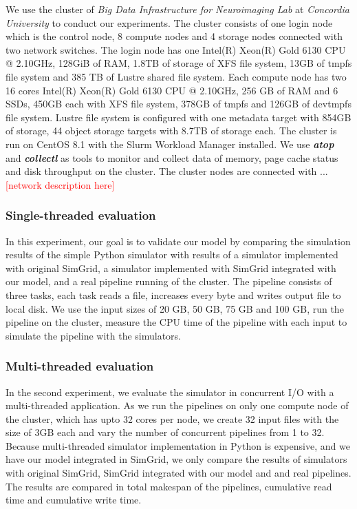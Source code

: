 \documentclass[conference]{IEEEtran}
\begin{document}
			We use the cluster of \textit{Big Data Infrastructure for Neuroimaging Lab} 
			at \textit{Concordia University} to conduct our experiments. The cluster 
			consists of one login node which is the control node, 8 compute nodes 
			and 4 storage nodes connected with two network switches. The login node 
			has one Intel(R) Xeon(R) Gold 6130 CPU @ 2.10GHz, 128GiB of RAM, 1.8TB 
			of storage of XFS file system, 13GB of tmpfs file system and 385 TB of 
			Lustre shared file system. Each compute node has two 16 cores Intel(R) 
			Xeon(R) Gold 6130 CPU @ 2.10GHz, 256 GB of RAM and 6 SSDs, 450GB each 
			with XFS file system, 378GB of tmpfs and 126GB of devtmpfs file system.
			Lustre file system is configured with one metadata target with 854GB 
			of storage, 44 object storage targets with 8.7TB of storage each. 
			The cluster is run on CentOS 8.1 with the Slurm Workload Manager installed. We use 
			\textbf{\textit{atop}} and \textbf{\textit{collectl}} as tools to monitor 
			and collect data of memory, page cache status and disk throughput on 
			the cluster. The cluster nodes are connected with ... 
			\textcolor{red}{[network description here]}
	
			\subsubsection{Single-threaded evaluation}

				In this experiment, our goal is to validate our model by comparing 
				the simulation results of the simple Python simulator with results of 
				a simulator implemented with original SimGrid, a simulator 
				implemented with SimGrid integrated with our model, and a real pipeline 
				running of the cluster. 
				The pipeline consists of three tasks, each task reads a file, 
				increases every byte and writes output file to local disk. 
				We use the input sizes of 20 GB, 50 GB, 75 GB and 100 GB, run 
				the pipeline on the cluster, measure the CPU time of the pipeline 
				with each input to simulate the pipeline with the simulators.

			\subsubsection{Multi-threaded evaluation}

				In the second experiment, we evaluate the simulator in concurrent I/O 
				with a multi-threaded application. As we run the pipelines on 
				only one compute node of the cluster, which has upto 32 cores per node,  
				we create 32 input files with the size of 3GB each and vary the number of 
				concurrent pipelines from 1 to 32. 
				Because multi-threaded simulator implementation in Python is 
				expensive, and we have our model integrated in SimGrid, 
				we only compare the results of simulators with original SimGrid, 
				SimGrid integrated with our model and and real pipelines. 
				The results are compared in total makespan of the pipelines, 
				cumulative read time and cumulative write time.
			
\end{document}
